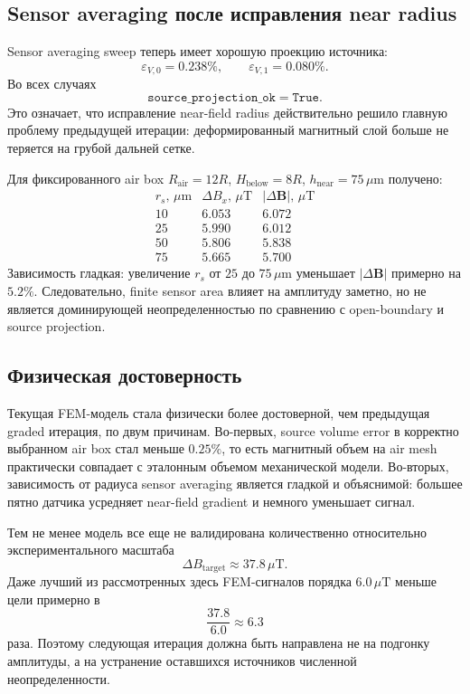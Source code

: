 \documentclass[12pt,a4paper]{article}
\begin{document}
\subsection*{Sensor averaging после исправления near radius}

Sensor averaging sweep теперь имеет хорошую проекцию источника:
\[
    \varepsilon_{V,0}=0.238\%,\qquad
    \varepsilon_{V,1}=0.080\%.
\]
Во всех случаях
\[
    \texttt{source\_projection\_ok}=\texttt{True}.
\]
Это означает, что исправление near-field radius действительно решило главную
проблему предыдущей итерации: деформированный магнитный слой больше не теряется
на грубой дальней сетке.

Для фиксированного air box \(R_{\mathrm{air}}=12R\),
\(H_{\mathrm{below}}=8R\), \(h_{\mathrm{near}}=75\,\mu\mathrm{m}\) получено:
\[
\begin{array}{lrr}
r_s,\,\mu\mathrm{m} & \Delta B_x,\,\mu\mathrm{T} & |\Delta\mathbf B|,\,\mu\mathrm{T}\\
\hline
10 & 6.053 & 6.072\\
25 & 5.990 & 6.012\\
50 & 5.806 & 5.838\\
75 & 5.665 & 5.700
\end{array}
\]
Зависимость гладкая: увеличение \(r_s\) от \(25\) до \(75\,\mu\mathrm{m}\)
уменьшает \(|\Delta\mathbf B|\) примерно на \(5.2\%\). Следовательно, finite
sensor area влияет на амплитуду заметно, но не является доминирующей
неопределенностью по сравнению с open-boundary и source projection.

\subsection*{Физическая достоверность}

Текущая FEM-модель стала физически более достоверной, чем предыдущая graded
итерация, по двум причинам. Во-первых, source volume error в корректно выбранном
air box стал меньше \(0.25\%\), то есть магнитный объем на air mesh практически
совпадает с эталонным объемом механической модели. Во-вторых, зависимость от
радиуса sensor averaging является гладкой и объяснимой: большее пятно датчика
усредняет near-field gradient и немного уменьшает сигнал.

Тем не менее модель все еще не валидирована количественно относительно
экспериментального масштаба
\[
    \Delta B_{\mathrm{target}}\approx 37.8\,\mu\mathrm{T}.
\]
Даже лучший из рассмотренных здесь FEM-сигналов порядка \(6.0\,\mu\mathrm{T}\)
меньше цели примерно в
\[
    \frac{37.8}{6.0}\approx 6.3
\]
раза. Поэтому следующая итерация должна быть направлена не на подгонку
амплитуды, а на устранение оставшихся источников численной неопределенности.
\end{document}

